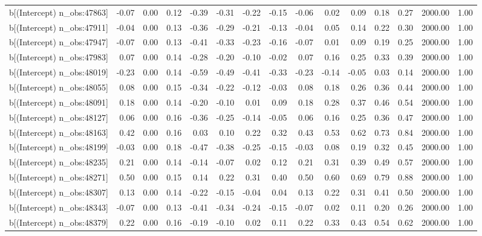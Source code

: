 \begin{table}[ht]
\begin{tabular}{rrrrrrrrrrrrrrr}
  b[(Intercept) n\_obs:47863] & -0.07 & 0.00 & 0.12 & -0.39 & -0.31 & -0.22 & -0.15 & -0.06 & 0.02 & 0.09 & 0.18 & 0.27 & 2000.00 & 1.00 \\ 
  b[(Intercept) n\_obs:47911] & -0.04 & 0.00 & 0.13 & -0.36 & -0.29 & -0.21 & -0.13 & -0.04 & 0.05 & 0.14 & 0.22 & 0.30 & 2000.00 & 1.00 \\ 
  b[(Intercept) n\_obs:47947] & -0.07 & 0.00 & 0.13 & -0.41 & -0.33 & -0.23 & -0.16 & -0.07 & 0.01 & 0.09 & 0.19 & 0.25 & 2000.00 & 1.00 \\ 
  b[(Intercept) n\_obs:47983] & 0.07 & 0.00 & 0.14 & -0.28 & -0.20 & -0.10 & -0.02 & 0.07 & 0.16 & 0.25 & 0.33 & 0.39 & 2000.00 & 1.00 \\ 
  b[(Intercept) n\_obs:48019] & -0.23 & 0.00 & 0.14 & -0.59 & -0.49 & -0.41 & -0.33 & -0.23 & -0.14 & -0.05 & 0.03 & 0.14 & 2000.00 & 1.00 \\ 
  b[(Intercept) n\_obs:48055] & 0.08 & 0.00 & 0.15 & -0.34 & -0.22 & -0.12 & -0.03 & 0.08 & 0.18 & 0.26 & 0.36 & 0.44 & 2000.00 & 1.00 \\ 
  b[(Intercept) n\_obs:48091] & 0.18 & 0.00 & 0.14 & -0.20 & -0.10 & 0.01 & 0.09 & 0.18 & 0.28 & 0.37 & 0.46 & 0.54 & 2000.00 & 1.00 \\ 
  b[(Intercept) n\_obs:48127] & 0.06 & 0.00 & 0.16 & -0.36 & -0.25 & -0.14 & -0.05 & 0.06 & 0.16 & 0.25 & 0.36 & 0.47 & 2000.00 & 1.00 \\ 
  b[(Intercept) n\_obs:48163] & 0.42 & 0.00 & 0.16 & 0.03 & 0.10 & 0.22 & 0.32 & 0.43 & 0.53 & 0.62 & 0.73 & 0.84 & 2000.00 & 1.00 \\ 
  b[(Intercept) n\_obs:48199] & -0.03 & 0.00 & 0.18 & -0.47 & -0.38 & -0.25 & -0.15 & -0.03 & 0.08 & 0.19 & 0.32 & 0.45 & 2000.00 & 1.00 \\ 
  b[(Intercept) n\_obs:48235] & 0.21 & 0.00 & 0.14 & -0.14 & -0.07 & 0.02 & 0.12 & 0.21 & 0.31 & 0.39 & 0.49 & 0.57 & 2000.00 & 1.00 \\ 
  b[(Intercept) n\_obs:48271] & 0.50 & 0.00 & 0.15 & 0.14 & 0.22 & 0.31 & 0.40 & 0.50 & 0.60 & 0.69 & 0.79 & 0.88 & 2000.00 & 1.00 \\ 
  b[(Intercept) n\_obs:48307] & 0.13 & 0.00 & 0.14 & -0.22 & -0.15 & -0.04 & 0.04 & 0.13 & 0.22 & 0.31 & 0.41 & 0.50 & 2000.00 & 1.00 \\ 
  b[(Intercept) n\_obs:48343] & -0.07 & 0.00 & 0.13 & -0.41 & -0.34 & -0.24 & -0.15 & -0.07 & 0.02 & 0.11 & 0.20 & 0.26 & 2000.00 & 1.00 \\ 
  b[(Intercept) n\_obs:48379] & 0.22 & 0.00 & 0.16 & -0.19 & -0.10 & 0.02 & 0.11 & 0.22 & 0.33 & 0.43 & 0.54 & 0.62 & 2000.00 & 1.00 \\ 

\end{tabular}
\end{table}
